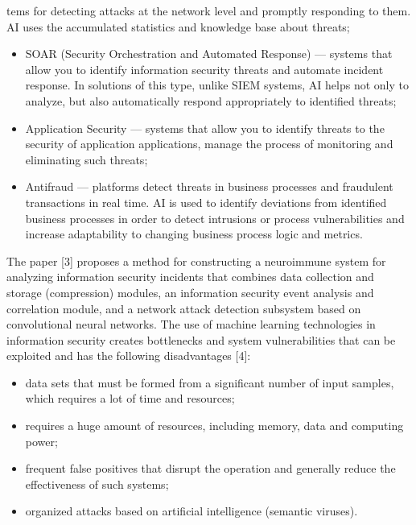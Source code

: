 \documentclass{article}
\date{}
\begin{document}
\begin{multicols}{2}
    \begin{description}[leftmargin=!, labelwidth=0.7cm, itemsep=-1.5mm]
tems for detecting attacks at the network level and promptly responding to them. AI uses the accumulated statistics and knowledge base about threats;
    \end{description}

\begin{itemize}
    \item SOAR (Security Orchestration and Automated Response) — systems that allow you to identify information security threats and automate incident response. In solutions of this type, unlike SIEM systems, AI helps not only to analyze, but also automatically respond appropriately to identified threats;
    \item Application Security — systems that allow you to identify threats to the security of application applications, manage the process of monitoring and eliminating such threats;
    \item Antifraud — platforms detect threats in business processes and fraudulent transactions in real time. AI is used to identify deviations from identified business processes in order to detect intrusions or process vulnerabilities and increase adaptability to changing business process logic and metrics.
\end {itemize}
\par

The paper [3] proposes a method for constructing a neuroimmune system for analyzing information security incidents that combines data collection and storage (compression) modules, an information security event analysis and correlation module, and a network attack detection subsystem based on convolutional neural networks. The use of machine learning technologies in information security creates bottlenecks and system vulnerabilities that can be exploited and has the following disadvantages [4]:

\begin{itemize}
    \item  data sets that must be formed from a significant
number of input samples, which requires a lot of
time and resources;
     \item requires a huge amount of resources, including
memory, data and computing power;
     \item frequent false positives that disrupt the operation and
generally reduce the effectiveness of such systems;
     \item organized attacks based on artificial intelligence
(semantic viruses).
\end{itemize}


\end{multicols}
\end{document}
